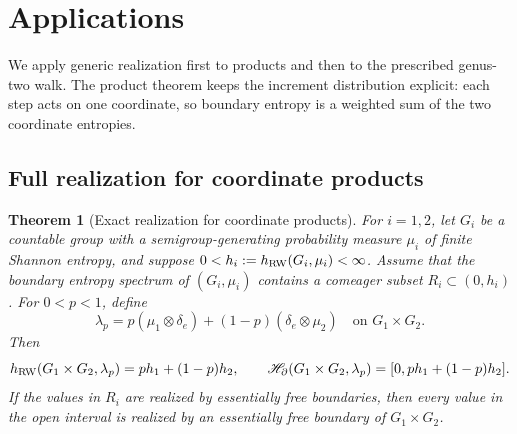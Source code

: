 \documentclass[11pt,letterpaper]{amsart}
\newtheorem{theorem}{Theorem}[section]
\theoremstyle{definition}
\theoremstyle{remark}
\numberwithin{equation}{section}
\begin{document}
\section{Applications}\label{sec:applications-editorial}

We apply generic realization first to products and then to the prescribed
genus-two walk. The product theorem keeps the increment distribution
explicit: each step acts on one coordinate, so boundary entropy is a
weighted sum of the two coordinate entropies.

\subsection{Full realization for coordinate products}

\begin{theorem}[Exact realization for coordinate products]
\label{thm:generic-product-regularization}
For $i=1,2$, let $G_i$ be a countable group with a semigroup-generating
probability measure $\mu_i$ of finite Shannon entropy, and suppose
$0<h_i:=h_{\rm RW}(G_i,\mu_i)<\infty$. Assume that the boundary
entropy spectrum of $(G_i,\mu_i)$ contains a comeager subset
$R_i\subset(0,h_i)$. For $0<p<1$, define
\[
 \lambda_p=p(\mu_1\otimes\delta_e)
          +(1-p)(\delta_e\otimes\mu_2)
 \quad\text{on }G_1\times G_2.
\]
Then
\[
 h_{\rm RW}(G_1\times G_2,\lambda_p)=ph_1+(1-p)h_2,
 \qquad
 \mathscr H_\partial(G_1\times G_2,\lambda_p)
      =[0,ph_1+(1-p)h_2].
\]
If the values in $R_i$ are realized by essentially free boundaries,
then every value in the open interval is realized by an essentially
free boundary of $G_1\times G_2$.
\end{theorem}
\end{document}
